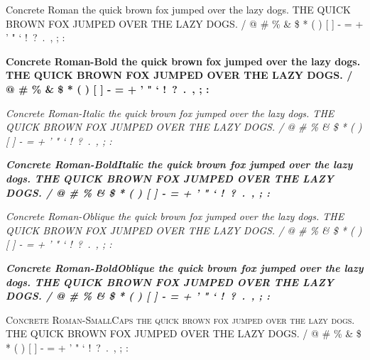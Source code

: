 \documentclass{article}
\begin{document}
{\selectfont
Concrete Roman \newline
the quick brown fox jumped over the lazy dogs. \newline
THE QUICK BROWN FOX JUMPED OVER THE LAZY DOGS.  / @ \# \% \& \$ * ( ) [ ] - = + ' " ` !\ ?\ .\ , ; : \par
{\bfseries
Concrete Roman-Bold \newline
the quick brown fox jumped over the lazy dogs. \newline
THE QUICK BROWN FOX JUMPED OVER THE LAZY DOGS.  / @ \# \% \& \$ * ( ) [ ] - = + ' " ` !\ ?\ .\ , ; : }\par
{\itshape
Concrete Roman-Italic \newline
the quick brown fox jumped over the lazy dogs. \newline
THE QUICK BROWN FOX JUMPED OVER THE LAZY DOGS.  / @ \# \% \& \$ * ( ) [ ] - = + ' " ` !\ ?\ .\ , ; : }\par
{\bfseries \itshape
Concrete Roman-BoldItalic \newline
the quick brown fox jumped over the lazy dogs. \newline
THE QUICK BROWN FOX JUMPED OVER THE LAZY DOGS.  / @ \# \% \& \$ * ( ) [ ] - = + ' " ` !\ ?\ .\ , ; : }\par
{\slshape
Concrete Roman-Oblique \newline
the quick brown fox jumped over the lazy dogs. \newline
THE QUICK BROWN FOX JUMPED OVER THE LAZY DOGS.  / @ \# \% \& \$ * ( ) [ ] - = + ' " ` !\ ?\ .\ , ; : } \par
{\bfseries \slshape
Concrete Roman-BoldOblique \newline
the quick brown fox jumped over the lazy dogs. \newline
THE QUICK BROWN FOX JUMPED OVER THE LAZY DOGS.  / @ \# \% \& \$ * ( ) [ ] - = + ' " ` !\ ?\ .\ , ; : }\par
{\scshape
Concrete Roman-SmallCaps \newline
the quick brown fox jumped over the lazy dogs. \newline
THE QUICK BROWN FOX JUMPED OVER THE LAZY DOGS.  / @ \# \% \& \$ * ( ) [ ] - = + ' " ` !\ ?\ .\ , ; : }}\par
\end{document}
